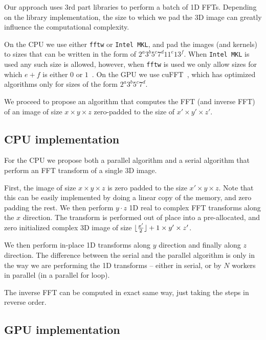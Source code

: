 \documentclass[conference]{IEEEtran}
\DeclarePairedDelimiter{\floor}{\lfloor}{\rfloor}
\begin{document}
  Our approach uses $3$rd part libraries to perform a batch of 1D
  FFTs.  Depending on the library implementation, the size to which we
  pad the 3D image can greatly influence the computational complexity.

  On the CPU we use either {\tt fftw} or {\tt Intel MKL}, and pad the
  images (and kernels) to sizes that can be written in the form of
  $2^a3^b5^c7^d11^e13^f$.  When {\tt Intel MKL} is used any such size
  is allowed, however, when {\tt fftw} is used we only allow sizes for
  which $e+f$ is either $0$ or $1$~\cite{frigo1999fftw,frigo1998fftw}.
  On the GPU we use cuFFT~\cite{nvidia2010cufft}, which has optimized
  algorithms only for sizes of the form $2^a3^b5^c7^d$.

  We proceed to propose an algorithm that computes the FFT (and
  inverse FFT) of an image of size $x \times y \times z$ zero-padded
  to the size of $x' \times y' \times z'$.

\subsection{CPU implementation}

  For the CPU we propose both a parallel algorithm and a serial
  algorithm that perform an FFT transform of a single 3D image.

  First, the image of size $x \times y \times z$ is zero padded to the
  size $x' \times y \times z$.  Note that this can be easily
  implemented by doing a linear copy of the memory, and zero padding
  the rest. We then perform $y \cdot z$ 1D real to complex FFT
  transforms along the $x$ direction.  The transform is performed out
  of place into a pre-allocated, and zero initialized complex 3D image
  of size $\floor{\frac{x'}{2}} + 1 \times y' \times z'$.

  We then perform in-place 1D transforms along $y$ direction and
  finally along $z$ direction.  The difference between the serial and
  the parallel algorithm is only in the way we are performing the 1D
  transforms -- either in serial, or by $N$ workers in parallel (in a
  parallel for loop).

  The inverse FFT can be computed in exact same way, just taking the
  steps in reverse order.

\subsection{GPU implementation}

\label{sec:gpu-fft-impl}
\end{document}
